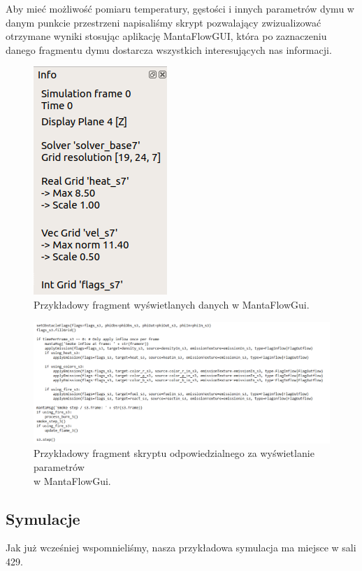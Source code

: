 \documentclass{article}
\begin{document}
	\medskip
	\noindent Aby mieć możliwość pomiaru temperatury, gęstości i innych parametrów dymu w danym punkcie przestrzeni napisaliśmy skrypt pozwalający zwizualizować otrzymane wyniki stosując aplikację MantaFlowGUI, która po zaznaczeniu danego fragmentu dymu dostarcza wszystkich interesujących nas informacji.
	
	\vspace{7mm}
	\begin{figure}[ht!]
		\centering
		\includegraphics[scale = 0.7]{gui_1.png}
		\caption{Przykładowy fragment wyświetlanych danych w MantaFlowGui.}
	\end{figure}
	
	\vspace{9mm}
	\begin{figure}[ht!]
		\centering
		\includegraphics[scale = 0.5]{skrypt_GUI.png}
		\caption{Przykładowy fragment skryptu odpowiedzialnego za wyświetlanie parametrów \\ w MantaFlowGui.}
	\end{figure}
	
	
	\pagebreak
	\subsection{Symulacje}
	Jak już wcześniej wspomnieliśmy, nasza przykładowa symulacja ma miejsce w sali 429. 
	
\end{document}
